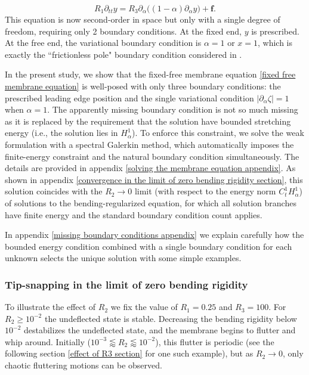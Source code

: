 \documentclass{article}[12pt]
\theoremstyle{Theorem}
\begin{document}
\begin{equation}
    R_1\partial_{t t} y = R_3\partial_\alpha\big((1 -\alpha)\partial_\alpha y) + \boldsymbol{f}.
    \label{simplified membrane equation}
\end{equation}
This equation is now second-order in space but only with a single degree of freedom, requiring only 2 boundary conditions. At the fixed end, $y$ is prescribed. At the free end, the variational boundary condition is $\alpha = 1$ or $x=1$, which is exactly the ``frictionless pole" boundary condition considered in \cite{mavroyiakoumou2020large, mavroyiakoumou2022membrane}.
\newline

In the present study, we show that the fixed-free membrane equation \eqref{fixed free membrane equation} is well-posed with only three boundary conditions: the prescribed leading edge position and the single variational condition $|\partial_\alpha \zeta|=1$ when $\alpha = 1$. The apparently missing boundary condition is not so much missing as it is replaced by the requirement that the solution have bounded stretching energy (i.e., the solution lies in $H^1_\alpha$). To enforce this constraint, we solve the weak formulation with a spectral Galerkin method, which automatically imposes the finite-energy constraint and the natural boundary condition simultaneously. The details are provided in appendix \ref{solving the membrane equation appendix}. As shown in appendix \ref{convergence in the limit of zero bending rigidity section}, this solution coincides with the $R_2 \rightarrow 0$ limit (with respect to the energy norm $C^1_tH^1_\alpha$) of solutions to the bending-regularized equation, for which all solution branches have finite energy and the standard boundary condition count applies.
\newline

In appendix \ref{missing boundary conditions appendix} we explain carefully how the bounded energy condition combined with a single boundary condition for each unknown selects the unique solution with some simple examples.

\subsubsection{Tip-snapping in the limit of zero bending rigidity}
To illustrate the effect of $R_2$ we fix the value of $R_1 = 0.25$ and $R_3 = 100$. For $R_2 \geq 10^{-2}$ the undeflected state is stable. Decreasing the bending rigidity below $10^{-2}$ destabilizes the undeflected state, and the membrane begins to flutter and whip around. Initially ($10^{-3} \lessapprox R_2 \lessapprox 10^{-2}$), this flutter is periodic \cite{alben2008flapping} (see the following section \ref{effect of R3 section} for one such example), but as $R_2\rightarrow 0$, only chaotic fluttering motions can be observed. 
\newline
\end{document}
